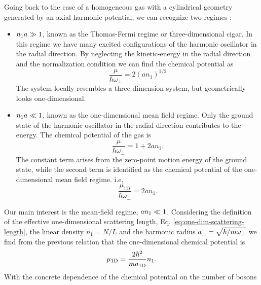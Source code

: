 Going back to the case of a homogeneous gas with a cylindrical geometry
generated by an axial harmonic potential, we can recognize two-regimes
\cite[pp~325]{bib:pitaevskii-stringari-bec.2003}:

\begin{itemize}
  \item $n_1 a \gg 1$, known as the Thomas-Fermi regime or three-dimensional
        cigar. In this regime we have many excited configurations of the
        harmonic oscillator in the radial direction. By neglecting the
        kinetic-energy in the radial direction and the normalization condition
        we can find the chemical potential as
        \begin{equation}
          \frac{\mu}{\hbar \omega_\bot} = 2(a n_1)^{1/2}
        \end{equation}
        The system locally resembles a three-dimension system, but geometrically
        looks one-dimensional.

  \item $n_1 a \ll 1$, known as the one-dimensional mean field regime. Only
        the ground state of the harmonic oscillator in the radial direction
        contributes to the energy. The chemical potential of the gas is
        \begin{equation}
          \label{eq:gross-pitaevskii-cigar-like-chemical-potential}
          \frac{\mu}{\hbar \omega_\bot} = 1 + 2 a n_1.
        \end{equation}
        The constant term arises from the zero-point motion energy of the ground
        state, while the second term is identified as the chemical potential of
        the one-dimensional mean field regime. i.e,
        \begin{equation}
          \frac{\mu_\mathrm{1D}}{\hbar \omega_\bot} = 2 a n_1.
        \end{equation}
\end{itemize}
%
Our main interest is the mean-field regime, $a n_1 \ll 1$. Considering the
definition of the effective one-dimensional scattering length, Eq.
\eqref{eq:one-dim-scattering-length}, the linear density $n_1 = N / L$ and the
harmonic radius $a_\bot = \sqrt{\hbar / m \omega_\bot}$ we find from the
previous relation that the one-dimensional chemical potential is
%
\begin{equation}
  \mu_\mathrm{1D} = \frac{2 \hbar^2}{m a_{ \mathrm{1D} }} n_1.
\end{equation}
%
With the concrete dependence of the chemical potential on the number of bosons
